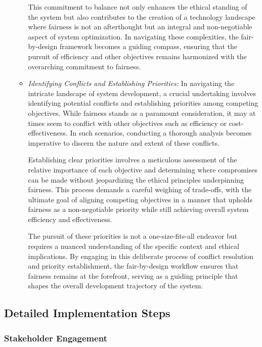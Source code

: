 \documentclass[12pt,a4paper,openright,twoside]{book}
\begin{document}
\begin{enumerate}
\begin{itemize}
            This commitment to balance not only enhances the ethical standing of the system but also contributes to the creation of a technology landscape where fairness is not an afterthought but an integral and non-negotiable aspect of system optimization. In navigating these complexities, the fair-by-design framework becomes a guiding compass, ensuring that the pursuit of efficiency and other objectives remains harmonized with the overarching commitment to fairness.
            
            \item \emph{Identifying Conflicts and Establishing Priorities:} In navigating the intricate landscape of system development, a crucial undertaking involves identifying potential conflicts and establishing priorities among competing objectives. While fairness stands as a paramount consideration, it may at times seem to conflict with other objectives such as efficiency or cost-effectiveness. In such scenarios, conducting a thorough analysis becomes imperative to discern the nature and extent of these conflicts.

            Establishing clear priorities involves a meticulous assessment of the relative importance of each objective and determining where compromises can be made without jeopardizing the ethical principles underpinning fairness. This process demands a careful weighing of trade-offs, with the ultimate goal of aligning competing objectives in a manner that upholds fairness as a non-negotiable priority while still achieving overall system efficiency and effectiveness.
            
            The pursuit of these priorities is not a one-size-fits-all endeavor but requires a nuanced understanding of the specific context and ethical implications. By engaging in this deliberate process of conflict resolution and priority establishment, the fair-by-design workflow ensures that fairness remains at the forefront, serving as a guiding principle that shapes the overall development trajectory of the system.

        \end{itemize}

\end{enumerate}

\subsection{Detailed Implementation Steps}

\subsubsection{Stakeholder Engagement}
\end{document}
